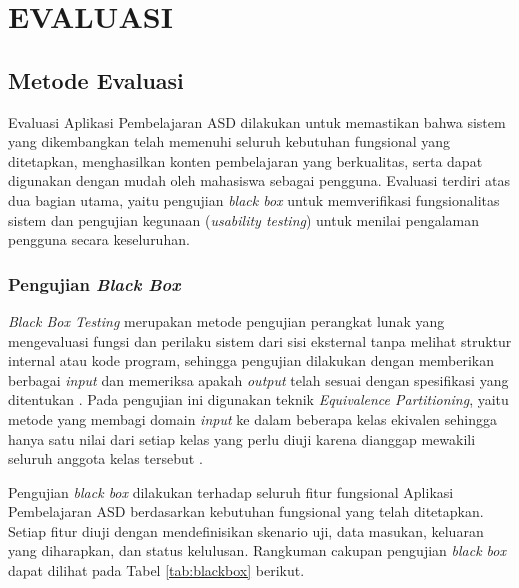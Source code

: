 \cleardoublepage
\chapter{EVALUASI}
\label{chap:evaluasi}

\section{Metode Evaluasi}

Evaluasi Aplikasi Pembelajaran ASD dilakukan untuk memastikan bahwa sistem yang dikembangkan telah memenuhi seluruh kebutuhan fungsional yang ditetapkan, menghasilkan konten pembelajaran yang berkualitas, serta dapat digunakan dengan mudah oleh mahasiswa sebagai pengguna. Evaluasi terdiri atas dua bagian utama, yaitu pengujian \textit{black box} untuk memverifikasi fungsionalitas sistem dan pengujian kegunaan (\textit{usability testing}) untuk menilai pengalaman pengguna secara keseluruhan.

\subsection{Pengujian \textit{Black Box}}

\textit{Black Box Testing} merupakan metode pengujian perangkat lunak yang mengevaluasi fungsi dan perilaku sistem dari sisi eksternal tanpa melihat struktur internal atau kode program, sehingga pengujian dilakukan dengan memberikan berbagai \textit{input} dan memeriksa apakah \textit{output} telah sesuai dengan spesifikasi yang ditentukan \cite{Pressman2015SWE}. Pada pengujian ini digunakan teknik \textit{Equivalence Partitioning}, yaitu metode yang membagi domain \textit{input} ke dalam beberapa kelas ekivalen sehingga hanya satu nilai dari setiap kelas yang perlu diuji karena dianggap mewakili seluruh anggota kelas tersebut \cite{Myers2011ArtOfSoftwareTesting}.

Pengujian \textit{black box} dilakukan terhadap seluruh fitur fungsional Aplikasi Pembelajaran ASD berdasarkan kebutuhan fungsional yang telah ditetapkan. Setiap fitur diuji dengan mendefinisikan skenario uji, data masukan, keluaran yang diharapkan, dan status kelulusan. Rangkuman cakupan pengujian \textit{black box} dapat dilihat pada Tabel \ref{tab:blackbox} berikut.

